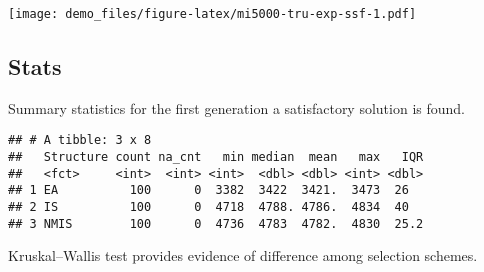 \documentclass[]{book}
\newenvironment{Shaded}{\begin{snugshade}}{\end{snugshade}}
\newcommand{\CharTok}[1]{\textcolor[rgb]{0.31,0.60,0.02}{#1}}
\newcommand{\DataTypeTok}[1]{\textcolor[rgb]{0.13,0.29,0.53}{#1}}
\newcommand{\DecValTok}[1]{\textcolor[rgb]{0.00,0.00,0.81}{#1}}
\newcommand{\KeywordTok}[1]{\textcolor[rgb]{0.13,0.29,0.53}{\textbf{#1}}}
\newcommand{\NormalTok}[1]{#1}
\newcommand{\OperatorTok}[1]{\textcolor[rgb]{0.81,0.36,0.00}{\textbf{#1}}}
\newcommand{\OtherTok}[1]{\textcolor[rgb]{0.56,0.35,0.01}{#1}}
\newcommand{\StringTok}[1]{\textcolor[rgb]{0.31,0.60,0.02}{#1}}
\begin{document}
\texttt{[image: demo\_files/figure-latex/mi5000-tru-exp-ssf-1.pdf]}

\hypertarget{stats-56}{%
\subsection{Stats}\label{stats-56}}

Summary statistics for the first generation a satisfactory solution is found.

\begin{Shaded}
\end{Shaded}

\begin{verbatim}
## # A tibble: 3 x 8
##   Structure count na_cnt   min median  mean   max   IQR
##   <fct>     <int>  <int> <int>  <dbl> <dbl> <int> <dbl>
## 1 EA          100      0  3382  3422  3421.  3473  26  
## 2 IS          100      0  4718  4788. 4786.  4834  40  
## 3 NMIS        100      0  4736  4783  4782.  4830  25.2
\end{verbatim}

Kruskal--Wallis test provides evidence of difference among selection schemes.
\end{document}
